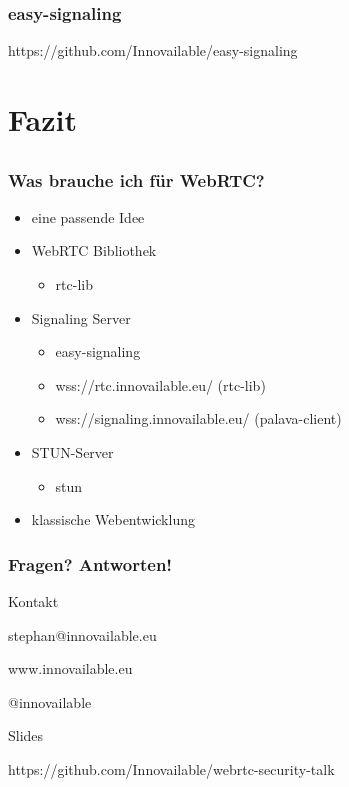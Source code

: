 \documentclass[12pt]{beamer}
\begin{document}
\begin{frame}
  \frametitle{easy-signaling}
  \pause
  
  \hfill \tiny https://github.com/Innovailable/easy-signaling
\end{frame}


\section{Fazit}
\subsection{}

\begin{frame}
  \frametitle{Was brauche ich für WebRTC?}
  \begin{itemize}
    \onslide<+->{}
    \item<+-> eine passende Idee
    \item<+-> WebRTC Bibliothek
    \begin{itemize}
      \item<+-> rtc-lib   \onslide<+->{\dots}
    \end{itemize}
    \item<+-> Signaling Server
    \begin{itemize}
      \item<+-> easy-signaling\onslide<+->{ \dots}
      \item<+-> wss://rtc.innovailable.eu/ (rtc-lib)
      \item<+-> wss://signaling.innovailable.eu/ (palava-client)
    \end{itemize}
    \item<+-> STUN-Server
    \begin{itemize}
      \item<+-> stun\onslide<+->{ \dots}
    \end{itemize}
    \item<+-> klassische Webentwicklung
  \end{itemize}
\end{frame}

\begin{frame}
  \frametitle{Fragen? Antworten!}

  \centerline{\scriptsize{Kontakt}}
  \centerline{stephan@innovailable.eu}
  \centerline{www.innovailable.eu}
  \centerline{@innovailable}

  \vspace{0.2in}

  \centerline{\scriptsize{Slides}}
  \centerline{https://github.com/Innovailable/webrtc-security-talk}
\end{frame}
\end{document}
